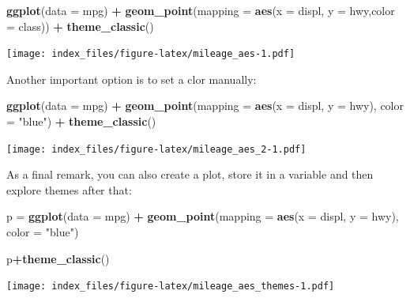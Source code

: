 \documentclass[]{article}
\newenvironment{Shaded}{\begin{snugshade}}{\end{snugshade}}
\newcommand{\DataTypeTok}[1]{\textcolor[rgb]{0.13,0.29,0.53}{#1}}
\newcommand{\KeywordTok}[1]{\textcolor[rgb]{0.13,0.29,0.53}{\textbf{#1}}}
\newcommand{\NormalTok}[1]{#1}
\newcommand{\OperatorTok}[1]{\textcolor[rgb]{0.81,0.36,0.00}{\textbf{#1}}}
\newcommand{\StringTok}[1]{\textcolor[rgb]{0.31,0.60,0.02}{#1}}
\begin{document}
\begin{Shaded}
\begin{Highlighting}[]
\KeywordTok{ggplot}\NormalTok{(}\DataTypeTok{data =}\NormalTok{ mpg) }\OperatorTok{+}\StringTok{ }
\StringTok{  }\KeywordTok{geom_point}\NormalTok{(}\DataTypeTok{mapping =} \KeywordTok{aes}\NormalTok{(}\DataTypeTok{x =}\NormalTok{ displ, }\DataTypeTok{y =}\NormalTok{ hwy,}\DataTypeTok{color =}\NormalTok{ class)) }\OperatorTok{+}
\StringTok{  }\KeywordTok{theme_classic}\NormalTok{()}
\end{Highlighting}
\end{Shaded}

\texttt{[image: index\_files/figure-latex/mileage\_aes-1.pdf]}

Another important option is to set a clor manually:

\begin{Shaded}
\begin{Highlighting}[]
\KeywordTok{ggplot}\NormalTok{(}\DataTypeTok{data =}\NormalTok{ mpg) }\OperatorTok{+}\StringTok{ }
\StringTok{  }\KeywordTok{geom_point}\NormalTok{(}\DataTypeTok{mapping =} \KeywordTok{aes}\NormalTok{(}\DataTypeTok{x =}\NormalTok{ displ, }\DataTypeTok{y =}\NormalTok{ hwy), }\DataTypeTok{color =} \StringTok{"blue"}\NormalTok{) }\OperatorTok{+}
\StringTok{  }\KeywordTok{theme_classic}\NormalTok{()}
\end{Highlighting}
\end{Shaded}

\texttt{[image: index\_files/figure-latex/mileage\_aes\_2-1.pdf]}

As a final remark, you can also create a plot, store it in a variable
and then explore themes after that:

\begin{Shaded}
\begin{Highlighting}[]
\NormalTok{p =}\StringTok{ }\KeywordTok{ggplot}\NormalTok{(}\DataTypeTok{data =}\NormalTok{ mpg) }\OperatorTok{+}\StringTok{ }
\StringTok{  }\KeywordTok{geom_point}\NormalTok{(}\DataTypeTok{mapping =} \KeywordTok{aes}\NormalTok{(}\DataTypeTok{x =}\NormalTok{ displ, }\DataTypeTok{y =}\NormalTok{ hwy), }\DataTypeTok{color =} \StringTok{"blue"}\NormalTok{) }

\NormalTok{p}\OperatorTok{+}\KeywordTok{theme_classic}\NormalTok{()}
\end{Highlighting}
\end{Shaded}

\texttt{[image: index\_files/figure-latex/mileage\_aes\_themes-1.pdf]}
\end{document}
